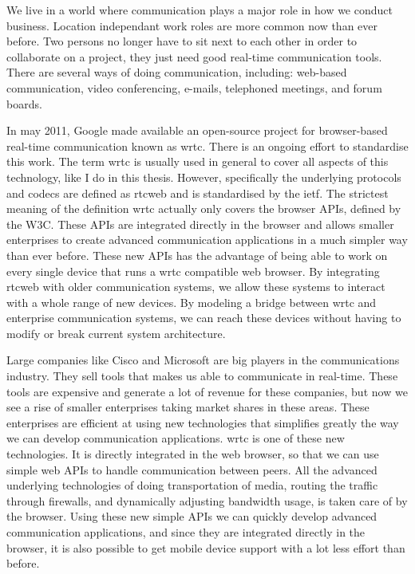 We live in a world where communication plays a major role in how we conduct business. Location independant work roles are more common now than ever before. Two persons no longer have to sit next to each other in order to collaborate on a project, they just need good real-time communication tools. There are several ways of doing communication, including: web-based communication, video conferencing, e-mails, telephoned meetings, and forum boards.

In may 2011, Google made available an open-source project for browser-based real-time communication known as \gls{wrtc}\cite{google-release-of-webrtc}. There is an ongoing effort to standardise this work. The term \gls{wrtc} is usually used in general to cover all aspects of this technology, like I do in this thesis. However, specifically the underlying protocols and codecs are defined as \gls{rtcweb} and is standardised by the \gls{ietf}\cite{ietf}. The strictest meaning of the definition \gls{wrtc} actually only covers the browser APIs, defined by the W3C\cite{w3c}. These APIs are integrated directly in the browser and allows smaller enterprises to create advanced communication applications in a much simpler way than ever before. These new APIs has the advantage of being able to work on every single device that runs a \gls{wrtc} compatible web browser. By integrating \gls{rtcweb} with older communication systems, we allow these systems to interact with a whole range of new devices. By modeling a bridge between \gls{wrtc} and enterprise communication systems, we can reach these devices without having to modify or break current system architecture.

Large companies like Cisco and Microsoft are big players in the communications industry. They sell tools that makes us able to communicate in real-time. These tools are expensive and generate a lot of revenue for these companies, but now we see a rise of smaller enterprises taking market shares in these areas. These enterprises are efficient at using new technologies that simplifies greatly the way we can develop communication applications. \gls{wrtc} is one of these new technologies. It is directly integrated in the web browser, so that we can use simple web APIs to handle communication between peers. All the advanced underlying technologies of doing transportation of media, routing the traffic through firewalls, and dynamically adjusting bandwidth usage, is taken care of by the browser. Using these new simple APIs we can quickly develop advanced communication applications, and since they are integrated directly in the browser, it is also possible to get mobile device support with a lot less effort than before.

